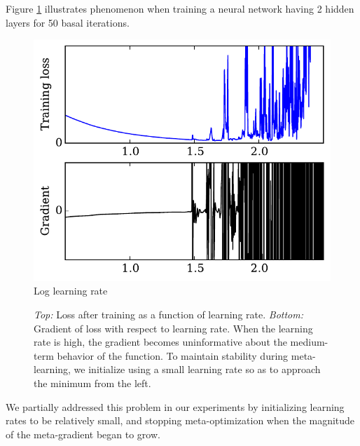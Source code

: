 \documentclass{article}
\newcommand{\primal}{basal}
\begin{document}
Figure \ref{fig:chaos} illustrates phenomenon when training a neural network having 2 hidden layers for 50 \primal{} iterations.
%
\begin{figure}[t]
\vskip 0.2in
\begin{center}
\includegraphics[width=\columnwidth]{../experiments/Jan_14_learning_rate_wiggliness/3/chaos.pdf}
\vskip -0.1in
Log learning rate
\caption{\emph{Top:} Loss after training as a function of learning rate.
\emph{Bottom:} Gradient of loss with respect to learning rate.
When the learning rate is high, the gradient becomes uninformative about the medium-term behavior of the function.
To maintain stability during meta-learning, we initialize using a small learning rate so as to approach the minimum from the left.}
\label{fig:chaos}
\end{center}
\vskip -0.2in
\end{figure} 
%
We partially addressed this problem in our experiments by initializing learning rates to be relatively small, and stopping meta-optimization when the magnitude of the meta-gradient began to grow.


\end{document}
